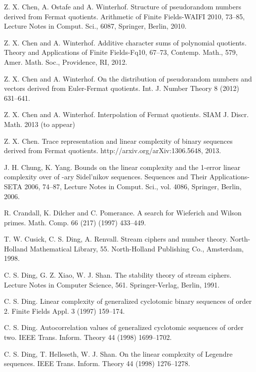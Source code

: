 \documentclass [11pt,a4paper]{article}
\begin{document}
\begin{thebibliography}{99}
  Z. X. Chen, A. Ostafe and  A. Winterhof. Structure of
pseudorandom numbers derived from Fermat quotients. Arithmetic of Finite Fields-WAIFI 2010, 73--85, Lecture Notes in Comput. Sci., 6087, Springer, Berlin, 2010.




Z. X. Chen  and A.  Winterhof. Additive character sums of
polynomial quotients. Theory and Applications of Finite Fields-Fq10,
67--73, Contemp. Math., 579, Amer. Math. Soc., Providence, RI, 2012.

Z. X. Chen  and A.  Winterhof. On the distribution of pseudorandom
numbers and vectors derived from Euler-Fermat quotients. Int. J.
Number Theory 8 (2012) 631--641.

 Z. X. Chen and A. Winterhof. Interpolation of Fermat quotients. SIAM J. Discr. Math. 2013 (to appear)



 Z. X. Chen. Trace representation and linear complexity of binary
sequences derived from Fermat quotients.  http://arxiv.org/arXiv:1306.5648, 2013.



J. H. Chung, K. Yang. Bounds on the linear complexity and the 1-error linear complexity over  of -ary Sidel'nikov sequences. Sequences and Their Applications-SETA 2006, 74--87, Lecture Notes in Comput. Sci., vol. 4086, Springer, Berlin, 2006.

  R. Crandall, K. Dilcher and C. Pomerance. A search for Wieferich
and Wilson primes. Math. Comp. 66 (217) (1997) 433--449.

T. W. Cusick, C. S. Ding, A. Renvall. Stream ciphers and number theory.
North-Holland Mathematical Library, 55. North-Holland Publishing
Co., Amsterdam, 1998.

C. S. Ding, G. Z. Xiao,  W. J. Shan.  The stability theory of stream
ciphers. Lecture Notes in Computer Science, 561. Springer-Verlag,
Berlin, 1991.

C. S. Ding. Linear complexity of generalized cyclotomic binary sequences
of order 2. Finite Fields Appl. 3 (1997)  159--174.


C. S. Ding. Autocorrelation values of generalized cyclotomic sequences of order two.
 IEEE Trans. Inform. Theory 44 (1998)  1699--1702.


C. S. Ding,  T. Helleseth,  W. J. Shan.  On the linear complexity of
Legendre sequences. IEEE Trans. Inform. Theory 44 (1998)
1276--1278.


\end{thebibliography}
\end{document}
